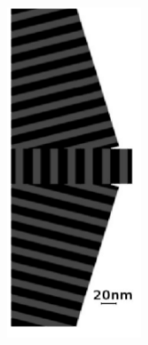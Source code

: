 
			\begin{figure}
				\includegraphics[angle=90,width=\textwidth]{images/multilayer/konc_eps_mgr.png}\\
			\end{figure}
